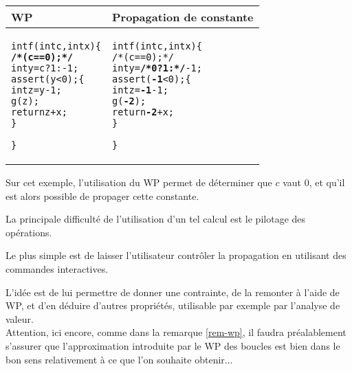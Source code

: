 \begin{exemple2}
\begin{center}
\begin{footnotesize}
\begin{tabular}{|p{5cm}|p{5cm}|}
\hline
WP & Propagation de constante \\
\hline
\begin{alltt}
int f (int c, int x) \{
 {\bf /* (c == 0); */ }
  int y = c ?  1 : -1;
  assert (y < 0); \{
    int z = y - 1;
    g (z);
    return z + x;
  \}

\}
\end{alltt}
&
\begin{alltt}
int f (int c, int x) \{
  /* (c == 0);  */
  int y = {\bf /* 0 ?  1 : */} -1;
  assert ({\bf -1} < 0); \{
    int z = {\bf -1} - 1;
    g ({\bf -2});
    return {\bf -2} + x;
  \}

\}
\end{alltt}
\\
\hline
\end{tabular}
\end{footnotesize}
\end{center}

Sur cet exemple, l'utilisation du WP permet de déterminer que $c$ vaut 0,
et qu'il est alors possible de propager cette constante.\\

\end{exemple2}


La principale difficulté de l'utilisation d'un tel calcul est le pilotage des
opérations.

Le plus simple est de laisser l'utilisateur contrôler la propagation
en utilisant des commandes interactives.

L'idée est de lui permettre de donner une contrainte,
de la remonter à l'aide de WP, et d'en déduire d'autres propriétés,
utilisable par exemple par l'analyse de valeur.\\

Attention, ici encore, comme dans la remarque \vref{rem-wp},
il faudra préalablement
s'assurer que l'approximation introduite par le WP des boucles est
bien dans le bon sens relativement à ce que l'on souhaite obtenir...
